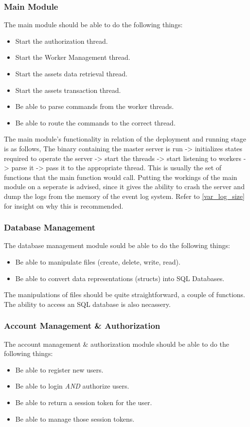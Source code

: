 \documentclass[a4paper]{article}
\begin{document}
\subsubsection{Main Module}
\label{master_mods_main}
The main module should be able to do the following things:
\begin{itemize}
	\item Start the authorization thread.
	\item Start the Worker Management thread.
	\item Start the assets data retrieval thread.
	\item Start the assets transaction thread.
	\item Be able to parse commands from the worker threads.
	\item Be able to route the commands to the correct thread.
\end{itemize}

The main module's functionality in relation of the deployment and running stage
is as follows, The binary containing the master server is run -> initializes 
states required to operate the server -> start the threads -> start listening 
to workers -> parse it -> pass it to the appropriate thread. This is usually 
the set of functions that the main function would call. Putting the workings 
of the main module on a seperate is advised, since it gives the ability to
crash the server and dump the logs from the memory of the event log system.
Refer to \ref{var_log_size} for insight on why this is recommended.

\subsubsection{Database Management}
\label{master_mods_db}
The database management module sould be able to do the following things:
\begin{itemize}
	\item Be able to manipulate files (create, delete, write, read).
	\item Be able to convert data representations (structs) into SQL Databases.
\end{itemize}

The manipulations of files should be quite straightforward, a couple of
functions. The ability to access an SQL database is also necassery.

\subsubsection{Account Management \& Authorization}
\label{master_mods_acc}
The account management \& authorization module  should be able to do the 
following things:
\begin{itemize}
	\item Be able to register new users.
	\item Be able to login \emph{AND} authorize users.
	\item Be able to return a session token for the user.
	\item Be able to manage those session tokens.
\end{itemize}
\end{document}
